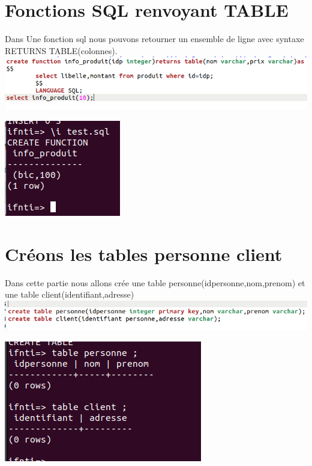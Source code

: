 \documentclass[12pt,b5paper]{article}
\begin{document}
\section{ Fonctions SQL renvoyant TABLE}
Dans Une fonction sql nous pouvons  retourner un ensemble de ligne avec syntaxe RETURNS TABLE(colonnes).\\ 

\includegraphics[scale=0.5]{pr}\\
\begin{center}
\includegraphics[scale=0.5]{pro}\\

\end{center}


\section{Créons les tables personne client }
Dans cette partie nous allons crée une table personne(idpersonne,nom,prenom) et une table client(identifiant,adresse)\\
\includegraphics[scale=0.5]{tables}\\
\begin{center}
\includegraphics[scale=0.5]{ta}\\
\end{center}
\end{document}
